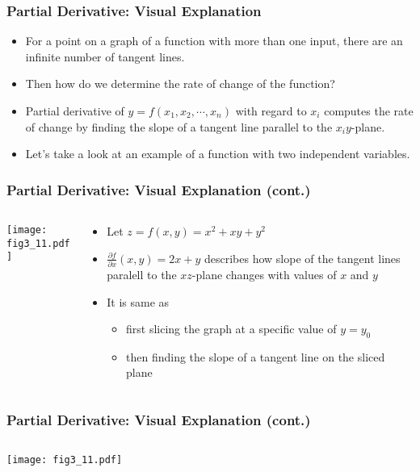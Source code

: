 \documentclass[pdflatex, 12pt]{beamer}
\begin{document}
\begin{frame}
\frametitle{Partial Derivative: Visual Explanation}
\begin{itemize}
\item For a point on a graph of a function with more than one input, there are an infinite number of tangent lines.
\vspace{0.4cm}  
\item Then how do we determine the rate of change of the function?
\vspace{0.4cm}
\item Partial derivative of $y = f(x_1, x_2, \cdots, x_n)$ with regard to $x_i$ computes the rate of change by finding the slope of a tangent line parallel to the $x_{i}y$-plane.
\vspace{0.4cm}
\item Let's take a look at an example of a function with two independent variables.
\end{itemize}
\end{frame}

\begin{frame}
\frametitle{Partial Derivative: Visual Explanation (cont.)}
\begin{columns}
\begin{column}{0.5\textwidth}
\centering
\texttt{[image: fig3\_11.pdf]}
\end{column}
\begin{column}{0.5\textwidth}
\begin{itemize}
\item Let $z = f(x, y) = x^2 + xy + y^2$
\vspace{0.4cm}
\item $\frac{\partial f}{\partial x} (x, y) = 2x + y$ describes how slope of the tangent lines paralell to the $xz$-plane changes with values of $x$ and $y$
\vspace{0.4cm}
\item It is same as
 \begin{itemize}
 \item first slicing the graph at a specific value of $y = y_0$
 \item then finding the slope of a tangent line on the sliced plane
 \end{itemize}
\end{itemize}
\end{column}
\end{columns}
\end{frame}

\begin{frame}
\frametitle{Partial Derivative: Visual Explanation (cont.)}
\begin{columns}
\begin{column}{0.5\textwidth}
\centering
\texttt{[image: fig3\_11.pdf]}
\end{column}
\begin{column}{0.5\textwidth}
\centering
{}
\end{column}
\end{columns}
\end{frame}
\end{document}
